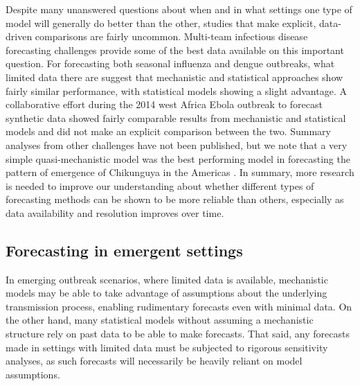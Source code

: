 \documentclass[a4paper]{article}
\begin{document}
Despite many unanswered questions about when and in what settings one type of model will generally do better than the other, studies that make explicit, data-driven comparisons are fairly uncommon.
Multi-team infectious disease forecasting challenges provide some of the best data available on this important question.
For forecasting both seasonal influenza and dengue outbreaks, what limited data there are suggest that mechanistic and statistical approaches show fairly similar performance, with statistical models showing a slight advantage.\cite{reich2019collaborative,mcgowan2019collaborative,johansson2019advancing} 
A collaborative effort during the 2014 west Africa Ebola outbreak to forecast synthetic data showed fairly comparable results from mechanistic and statistical models and did not make an explicit comparison between the two.\cite{viboud2017rapidd}
Summary analyses from other challenges have not been published, but we note that a very simple quasi-mechanistic model was the best performing model in forecasting the pattern of emergence of Chikunguya in the Americas \cite{lega2016data, DARPA2015}.
In summary, more research is needed to improve our understanding about whether different types of forecasting methods can be shown to be more reliable than others, especially as data availability and resolution improves over time.

\subsection{Forecasting in emergent settings} \label{sec:emerging}

In emerging outbreak scenarios, where limited data is available, mechanistic models may be able to take advantage of assumptions about the underlying transmission process, enabling rudimentary forecasts even with minimal data.
On the other hand, many statistical models without assuming a mechanistic structure rely on past data to be able to make forecasts.
That said, any forecasts made in settings with limited data must be subjected to rigorous sensitivity analyses, as such forecasts will necessarily be heavily reliant on model assumptions.
\end{document}
